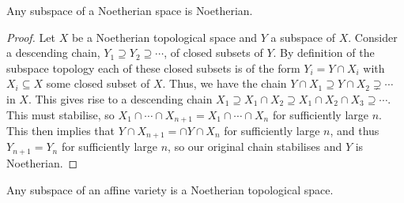 \documentclass[fleqn]{NotesClass}
\begin{document}
    \begin{lma}{}{}
        Any subspace of a Noetherian space is Noetherian.
        \begin{proof}
            Let \(X\) be a Noetherian topological space and \(Y\) a subspace of \(X\).
            Consider a descending chain, \(Y_1 \supseteq Y_2 \supseteq \dotsb\), of closed subsets of \(Y\).
            By definition of the subspace topology each of these closed subsets is of the form \(Y_i = Y \cap X_i\) with \(X_i \subseteq X\) some closed subset of \(X\).
            Thus, we have the chain \(Y \cap X_1 \supseteq Y \cap X_2 \supsetneq \dotsb\) in \(X\).
            This gives rise to a descending chain \(X_1 \supseteq X_1 \cap X_2 \supseteq X_1 \cap X_2 \cap X_3 \supseteq \dotsb\).
            This must stabilise, so \(X_1 \cap \dotsb \cap X_{n+1} = X_1 \cap \dotsb \cap X_n\) for sufficiently large \(n\).
            This then implies that \(Y \cap X_{n+1} =  \cap Y \cap X_n\) for sufficiently large \(n\), and thus \(Y_{n+1} = Y_n\) for sufficiently large \(n\), so our original chain stabilises and \(Y\) is Noetherian.
        \end{proof}
    \end{lma}
    
    \begin{crl}{}{}
        Any subspace of an affine variety is a Noetherian topological space.
    \end{crl}
    
\end{document}
